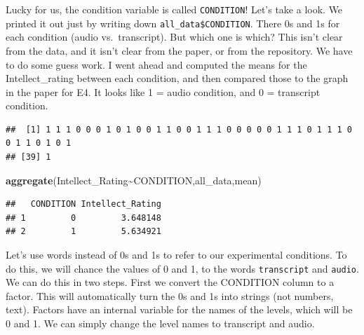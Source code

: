 \documentclass[
]{book}
\newenvironment{Shaded}{\begin{snugshade}}{\end{snugshade}}
\newcommand{\FunctionTok}[1]{\textcolor[rgb]{0.13,0.29,0.53}{\textbf{#1}}}
\newcommand{\NormalTok}[1]{#1}
\newcommand{\OtherTok}[1]{\textcolor[rgb]{0.56,0.35,0.01}{#1}}
\newcommand{\SpecialCharTok}[1]{\textcolor[rgb]{0.81,0.36,0.00}{\textbf{#1}}}
\newcommand{\StringTok}[1]{\textcolor[rgb]{0.31,0.60,0.02}{#1}}
\begin{document}
Lucky for us, the condition variable is called \texttt{CONDITION}! Let's take a look. We printed it out just by writing down \texttt{all\_data\$CONDITION}. There 0s and 1s for each condition (audio vs.~transcript). But which one is which? This isn't clear from the data, and it isn't clear from the paper, or from the repository. We have to do some guess work. I went ahead and computed the means for the Intellect\_rating between each condition, and then compared those to the graph in the paper for E4. It looks like 1 = audio condition, and 0 = transcript condition.

\begin{Shaded}
\end{Shaded}

\begin{verbatim}
##  [1] 1 1 1 0 0 0 1 0 1 0 0 1 1 0 0 1 1 1 0 0 0 0 0 1 1 1 0 1 1 1 0 0 1 1 0 1 0 1
## [39] 1
\end{verbatim}

\begin{Shaded}
\begin{Highlighting}[]
\FunctionTok{aggregate}\NormalTok{(Intellect\_Rating}\SpecialCharTok{\textasciitilde{}}\NormalTok{CONDITION,all\_data,mean)}
\end{Highlighting}
\end{Shaded}

\begin{verbatim}
##   CONDITION Intellect_Rating
## 1         0         3.648148
## 2         1         5.634921
\end{verbatim}

Let's use words instead of 0s and 1s to refer to our experimental conditions. To do this, we will chance the values of 0 and 1, to the words \texttt{transcript} and \texttt{audio}. We can do this in two steps. First we convert the CONDITION column to a factor. This will automatically turn the 0s and 1s into strings (not numbers, text). Factors have an internal variable for the names of the levels, which will be 0 and 1. We can simply change the level names to transcript and audio.

\begin{Shaded}
\end{Shaded}
\end{document}
